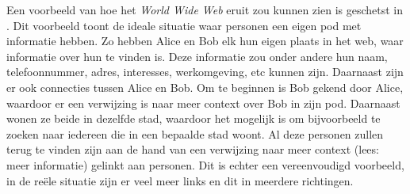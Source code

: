 Een voorbeeld van hoe het \textit{World Wide Web} eruit zou kunnen zien is geschetst in . Dit voorbeeld toont de ideale situatie waar personen een eigen pod met informatie hebben. Zo hebben Alice en Bob elk hun eigen plaats in het web, waar informatie over hun te vinden is. Deze informatie zou onder andere hun naam, telefoonnummer, adres, interesses, werkomgeving, etc kunnen zijn. Daarnaast zijn er ook connecties tussen Alice en Bob. Om te beginnen is Bob gekend door Alice, waardoor er een verwijzing is naar meer context over Bob in zijn pod. Daarnaast wonen ze beide in dezelfde stad, waardoor het mogelijk is om bijvoorbeeld te zoeken naar iedereen die in een bepaalde stad woont. Al deze personen zullen terug te vinden zijn aan de hand van een verwijzing naar meer context (lees: meer informatie) gelinkt aan personen. Dit is echter een vereenvoudigd voorbeeld, in de reële situatie zijn er veel meer links en dit in meerdere richtingen.